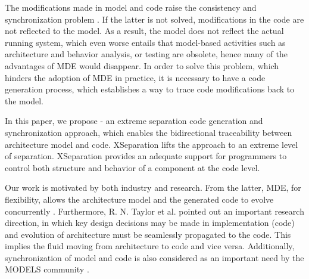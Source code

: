 The modifications made in model and code raise the consistency and synchronization problem \cite{zheng2013classification}.
If the latter is not solved, modifications in the code are not reflected to the model. 
As a result, the model does not reflect the actual running system, which even worse entails that model-based activities such as architecture and behavior analysis, or testing are obsolete, hence many of the advantages of MDE would disappear.
In order to solve this problem, which hinders the adoption of MDE in practice, it is necessary to have a code generation process, which establishes a way to trace code modifications back to the model.

In this paper, we propose  - an extreme separation code generation and synchronization approach, which enables the bidirectional traceability between architecture model 
 and code.
XSeparation lifts the  approach to an extreme level of separation.
XSeparation provides an adequate support for programmers to control both structure and behavior of a component at the code level. %

Our work is motivated by both industry and research.
From the latter, MDE, for flexibility, allows the architecture model and the generated code to evolve concurrently \cite{yu2012maintaining}.
Furthermore, R. N. Taylor et al. \cite{Taylor:2007:SDA:1253532.1254721} pointed out an important research direction, in which key design decisions may be made in implementation (code) and evolution of architecture must be seamlessly propagated to the code. 
This implies the fluid moving from architecture to code and vice versa. 
Additionally, synchronization of model and code is also considered as an important need by the MODELS community \cite{van2008challenges}.

